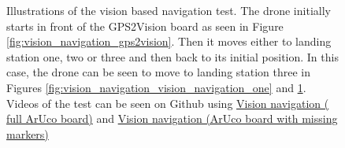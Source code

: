 \documentclass[../Head/report.tex]{subfiles}
\begin{document}
\begin{figure}[H]
\begin{subfigure}[t]{.30\textwidth}
        \caption{}
        \label{fig:vision_navigation_vision_navigation_two}
    \end{subfigure}
    \caption{Illustrations of the vision based navigation test. The drone initially starts in front of the GPS2Vision board as seen in Figure \ref{fig:vision_navigation_gps2vision}. Then it moves either to landing station one, two or three and then back to its initial position. In this case, the drone can be seen to move to landing station three in Figures \ref{fig:vision_navigation_vision_navigation_one} and \ref{fig:vision_navigation_vision_navigation_two}. Videos of the test can be seen on Github using \href{https://github.com/Kenil16/master_project/tree/master/test_videos/vision_navigation_full_marker_board_vel_1.0}{Vision navigation ( full ArUco board)} and \href{https://github.com/Kenil16/master_project/tree/master/test_videos/vision_navigation_one_pattern_board_missing_markers_wear_vel_5.0}{Vision navigation (ArUco board with missing markers)}}
    \label{fig:vision_navigation}
\end{figure}
\end{document}
